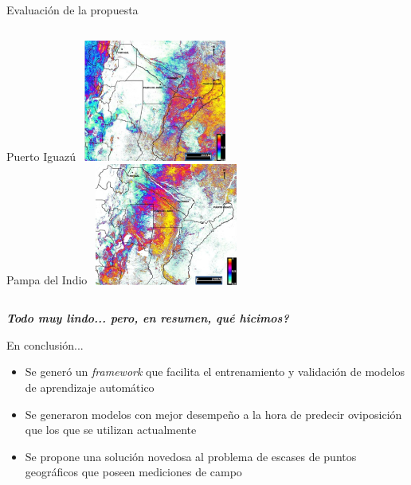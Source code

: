 \documentclass[10pt]{beamer}
\newcommand\IncrFont{\fontsize{20}{20}\selectfont}
\begin{document}
\begin{frame}{Evaluación de la propuesta}

    \begin{columns}[t]
    \centering
    Puerto Iguazú
    \includegraphics[width=5cm,height=4cm]{ned_iguazu}\\
    \centering
    Pampa del Indio
    \includegraphics[width=5cm,height=4cm]{ned_pampa}
    \end{columns}

\end{frame}

\begin{frame}{}
  \IncrFont
  \begin{center}
    \textit{\textbf{Todo muy lindo... pero, en resumen, qué hicimos?}}
  \end{center}
\end{frame}


\begin{frame}{En conclusión...}
  \begin{itemize}[<+->]
    \item Se generó un \textit{framework} que facilita el entrenamiento y
        validación de modelos de aprendizaje automático
    \item Se generaron modelos con mejor desempeño a la hora de predecir
        oviposición que los que se utilizan actualmente
    \item Se propone una solución novedosa al problema de escases de puntos
        geográficos que poseen mediciones de campo
  \end{itemize}
\end{frame}
\end{document}
